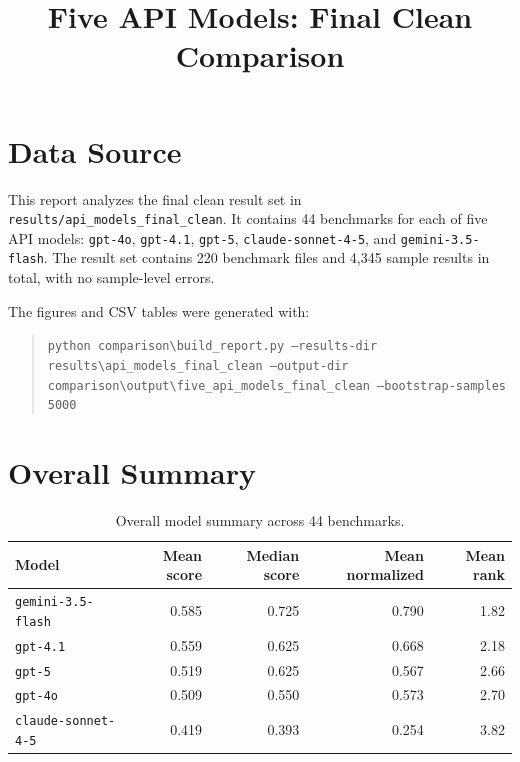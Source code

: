 \documentclass[11pt,a4paper]{article}
\title{\textbf{Five API Models: Final Clean Comparison}}
\author{}
\date{}
\newcommand{\code}[1]{\texttt{#1}}
\begin{document}
\maketitle

\section{Data Source}

This report analyzes the final clean result set in
\code{results/api\_models\_final\_clean}. It contains 44 benchmarks for each of
five API models: \code{gpt-4o}, \code{gpt-4.1}, \code{gpt-5},
\code{claude-sonnet-4-5}, and \code{gemini-3.5-flash}. The result set contains
220 benchmark files and 4,345 sample results in total, with no sample-level
errors.

The figures and CSV tables were generated with:

\begin{quote}
\code{python comparison\textbackslash build\_report.py --results-dir results\textbackslash api\_models\_final\_clean --output-dir comparison\textbackslash output\textbackslash five\_api\_models\_final\_clean --bootstrap-samples 5000}
\end{quote}

\section{Overall Summary}

\begin{table}[H]
\centering
\small
\caption{Overall model summary across 44 benchmarks.}
\begin{tabularx}{\textwidth}{@{}lrrrr@{}}
\toprule
\textbf{Model} & \textbf{Mean score} & \textbf{Median score} & \textbf{Mean normalized} & \textbf{Mean rank} \\
\midrule
\code{gemini-3.5-flash} & 0.585 & 0.725 & 0.790 & 1.82 \\
\code{gpt-4.1} & 0.559 & 0.625 & 0.668 & 2.18 \\
\code{gpt-5} & 0.519 & 0.625 & 0.567 & 2.66 \\
\code{gpt-4o} & 0.509 & 0.550 & 0.573 & 2.70 \\
\code{claude-sonnet-4-5} & 0.419 & 0.393 & 0.254 & 3.82 \\
\bottomrule
\end{tabularx}
\end{table}
\end{document}
